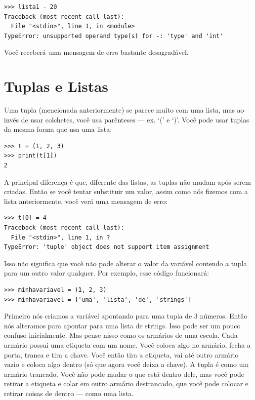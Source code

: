 \begin{listing}
\begin{verbatim}
>>> lista1 - 20
Traceback (most recent call last):
  File "<stdin>", line 1, in <module>
TypeError: unsupported operand type(s) for -: 'type' and 'int'
\end{verbatim}
\end{listing}

\noindent
Você receberá uma mensagem de erro bastante desagradável.

\section{Tuplas e Listas}\label{tuplesandlists}

Uma tupla (mencionada anteriormente) se parece muito com uma lista, mas ao invés de usar colchetes, você usa parênteses --- ex. `(' e `)'. Você pode usar tuplas da mesma forma que usa uma lista:

\begin{listing}
\begin{verbatim}
>>> t = (1, 2, 3)
>>> print(t[1])
2
\end{verbatim}
\end{listing}

A principal diferença é que, diferente das listas, as tuplas não mudam após serem criadas. Então se você tentar substituir um valor, assim como nós fizemos com a lista anteriormente, você verá uma mensagem de erro:

\begin{listing}
\begin{verbatim}
>>> t[0] = 4
Traceback (most recent call last):
  File "<stdin>", line 1, in ?
TypeError: 'tuple' object does not support item assignment
\end{verbatim}
\end{listing}

Isso não significa que você não pode alterar o valor da variável contendo a tupla para um outro valor qualquer. Por exemplo, esse código funcionará:

\begin{listing}
\begin{verbatim}
>>> minhavariavel = (1, 2, 3)
>>> minhavariavel = ['uma', 'lista', 'de', 'strings']
\end{verbatim}
\end{listing}

Primeiro nós criamos a variável  apontando para uma tupla de 3 números. Então nós alteramos  para apontar para uma lista de strings. Isso pode ser um pouco confuso inicialmente. Mas pense nisso como os armários de uma escola. Cada armário possui uma etiqueta com um nome. Você coloca algo no armário, fecha a porta, tranca e tira a chave. Você então tira a etiqueta, vai até outro armário vazio e coloca algo dentro (só que agora você deixa a chave). A tupla é como um armário trancado. Você não pode mudar o que está dentro dele, mas você pode retirar a etiqueta e colar em outro armário destrancado, que você pode colocar e retirar coisas de dentro --- como uma lista.

